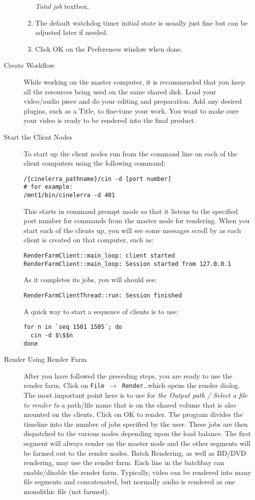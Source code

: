 \begin{description}
\begin{enumerate}
    \textit{Total job} textbox.
  \item The default watchdog timer initial state is usually just
    fine but can be adjusted later if needed.
  \item Click OK on the Preferences window when done.
  \end{enumerate}
\item[Create Workflow] While working on the master computer, it is
  recommended that you keep all the resources being used on the same
  shared disk.  Load your video/audio piece and do your editing and
  preparation.  Add any desired plugins, such as a Title, to fine-tune
  your work.  You want to make sure your video is ready to be rendered
  into the final product.
\item[Start the Client Nodes] To start up the client nodes run
  \CGG{} from the command line on each of the client computers using
  the following command:
\begin{lstlisting}[style=sh]
/{cinelerra_pathname}/cin -d [port number]
# for example:
/mnt1/bin/cinelerra -d 401
\end{lstlisting} This starts \CGG{} in command prompt mode so that
  it listens to the specified port number for commands from the master
  node for rendering.  When you start each of the clients up, you will
  see some messages scroll by as each client is created on that
  computer, such as:
\begin{lstlisting}[style=sh]
RenderFarmClient::main_loop: client started
RenderFarmClient::main_loop: Session started from 127.0.0.1
\end{lstlisting} As it completes its jobs, you will should see:
\begin{lstlisting}[style=sh]
RenderFarmClientThread::run: Session finished
\end{lstlisting} A quick way to start a sequence of clients is to
  use:
\begin{lstlisting}[style=sh,mathescape]
for n in `seq 1501 1505`; do
  cin -d $\$$n
done
\end{lstlisting}
\item[Render Using Render Farm] After you have followed the
  preceding steps, you are ready to use the render farm.  Click on
  \texttt{File $\rightarrow$ Render}\dots which opens the render
  dialog.  The most important point here is to use for \textit{the
    Output path / Select a file to render to} a path/file name that is
  on the shared volume that is also mounted on the clients.  Click on
  OK to render. The \CGG{} program divides the timeline into the
  number of jobs specified by the user.  These jobs are then
  dispatched to the various nodes depending upon the load balance. The
  first segment will always render on the master node and the other
  segments will be farmed out to the render nodes.  Batch Rendering,
  as well as BD/DVD rendering, may use the render farm.  Each line in
  the batchbay can enable/disable the render farm.  Typically, video
  can be rendered into many file segments and concatenated, but
  normally audio is rendered as one monolithic file (not farmed).


\end{description}
